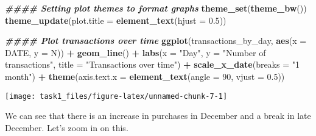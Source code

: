\documentclass[
]{article}
\newenvironment{Shaded}{\begin{snugshade}}{\end{snugshade}}
\newcommand{\AttributeTok}[1]{\textcolor[rgb]{0.13,0.29,0.53}{#1}}
\newcommand{\DecValTok}[1]{\textcolor[rgb]{0.00,0.00,0.81}{#1}}
\newcommand{\DocumentationTok}[1]{\textcolor[rgb]{0.56,0.35,0.01}{\textbf{\textit{#1}}}}
\newcommand{\FloatTok}[1]{\textcolor[rgb]{0.00,0.00,0.81}{#1}}
\newcommand{\FunctionTok}[1]{\textcolor[rgb]{0.13,0.29,0.53}{\textbf{#1}}}
\newcommand{\NormalTok}[1]{#1}
\newcommand{\SpecialCharTok}[1]{\textcolor[rgb]{0.81,0.36,0.00}{\textbf{#1}}}
\newcommand{\StringTok}[1]{\textcolor[rgb]{0.31,0.60,0.02}{#1}}
\begin{document}
\begin{Shaded}
\begin{Highlighting}[]
\DocumentationTok{\#\#\#\# Setting plot themes to format graphs}
\FunctionTok{theme\_set}\NormalTok{(}\FunctionTok{theme\_bw}\NormalTok{())}
\FunctionTok{theme\_update}\NormalTok{(}\AttributeTok{plot.title =} \FunctionTok{element\_text}\NormalTok{(}\AttributeTok{hjust =} \FloatTok{0.5}\NormalTok{))}

\DocumentationTok{\#\#\#\# Plot transactions over time}
\FunctionTok{ggplot}\NormalTok{(transactions\_by\_day, }\FunctionTok{aes}\NormalTok{(}\AttributeTok{x =}\NormalTok{ DATE, }\AttributeTok{y =}\NormalTok{ N)) }\SpecialCharTok{+}
\FunctionTok{geom\_line}\NormalTok{() }\SpecialCharTok{+}
\FunctionTok{labs}\NormalTok{(}\AttributeTok{x =} \StringTok{"Day"}\NormalTok{, }\AttributeTok{y =} \StringTok{"Number of transactions"}\NormalTok{, }\AttributeTok{title =} \StringTok{"Transactions over time"}\NormalTok{) }\SpecialCharTok{+}
\FunctionTok{scale\_x\_date}\NormalTok{(}\AttributeTok{breaks =} \StringTok{"1 month"}\NormalTok{) }\SpecialCharTok{+}
\FunctionTok{theme}\NormalTok{(}\AttributeTok{axis.text.x =} \FunctionTok{element\_text}\NormalTok{(}\AttributeTok{angle =} \DecValTok{90}\NormalTok{, }\AttributeTok{vjust =} \FloatTok{0.5}\NormalTok{))}
\end{Highlighting}
\end{Shaded}

\begin{center}\texttt{[image: task1\_files/figure-latex/unnamed-chunk-7-1]} \end{center}

We can see that there is an increase in purchases in December and a
break in late December. Let's zoom in on this.
\end{document}

